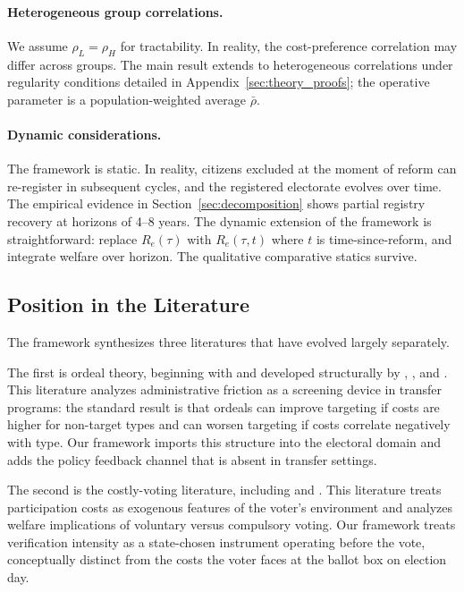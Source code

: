 \paragraph{Heterogeneous group correlations.} We assume $\rho_L = \rho_H$ for tractability. In reality, the cost-preference correlation may differ across groups. The main result extends to heterogeneous correlations under regularity conditions detailed in Appendix~\ref{sec:theory_proofs}; the operative parameter is a population-weighted average $\bar\rho$.

\paragraph{Dynamic considerations.} The framework is static. In reality, citizens excluded at the moment of reform can re-register in subsequent cycles, and the registered electorate evolves over time. The empirical evidence in Section~\ref{sec:decomposition} shows partial registry recovery at horizons of 4--8 years. The dynamic extension of the framework is straightforward: replace $R_e(\tau)$ with $R_e(\tau, t)$ where $t$ is time-since-reform, and integrate welfare over horizon. The qualitative comparative statics survive.

\subsection{Position in the Literature}
\label{ssec:position}

The framework synthesizes three literatures that have evolved largely separately.

The first is ordeal theory, beginning with \citet{Nichols1982TargetinTransferThrough} and developed structurally by \citet{Alatas2016NetworkStructurAnd}, \citet{Finkelstein2025LivesVersusLiveliho}, and \citet{Deshpande2019WhoScreenedOut}. This literature analyzes administrative friction as a screening device in transfer programs: the standard result is that ordeals can improve targeting if costs are higher for non-target types and can worsen targeting if costs correlate negatively with type. Our framework imports this structure into the electoral domain and adds the policy feedback channel that is absent in transfer settings.

The second is the costly-voting literature, including \citet{Borgers2004CostlyVoting} and \citet{Krasa2008MandatorVotingBetter}. This literature treats participation costs as exogenous features of the voter's environment and analyzes welfare implications of voluntary versus compulsory voting. Our framework treats verification intensity as a state-chosen instrument operating before the vote, conceptually distinct from the costs the voter faces at the ballot box on election day.

